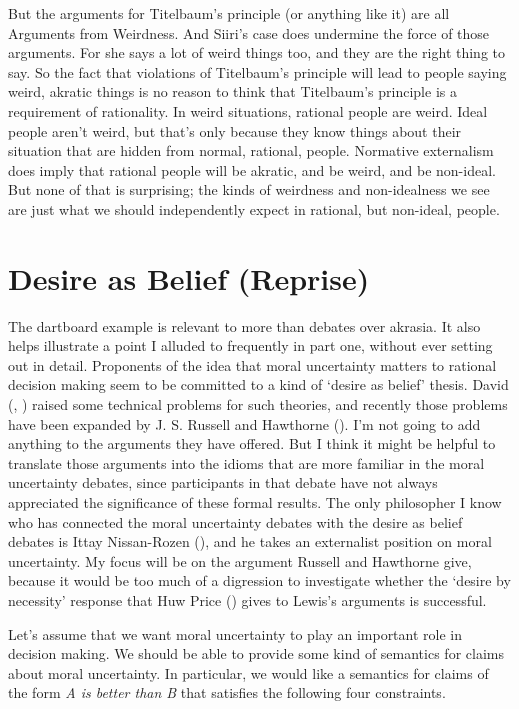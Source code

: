 \documentclass[
  10pt,
  letterpaper,
  twoside]{scrbook}
\begin{document}
But the arguments for Titelbaum's principle (or anything like it) are
all Arguments from Weirdness. And {Siiri}'s case does undermine the
force of those arguments. For she says a lot of weird things too, and
they are the right thing to say. So the fact that violations of
Titelbaum's principle will lead to people saying weird, akratic things
is no reason to think that Titelbaum's principle is a requirement of
rationality. In weird situations, rational people are weird. Ideal
people aren't weird, but that's only because they know things about
their situation that are hidden from normal, rational, people. Normative
externalism does imply that rational people will be akratic, and be
weird, and be non-ideal. But none of that is surprising; the kinds of
weirdness and non-idealness we see are just what we should independently
expect in rational, but non-ideal, people.

\section{Desire as Belief (Reprise)}\label{desireasbeliefreprise}

The dartboard example is relevant to more than debates over akrasia. It
also helps illustrate a point I alluded to frequently in part one,
without ever setting out in detail. Proponents of the idea that moral
uncertainty matters to rational decision making seem to be committed to
a kind of `desire as belief' thesis. David
(,
) raised some technical problems for
such theories, and recently those problems have been expanded by J. S.
Russell and Hawthorne (). I'm
not going to add anything to the arguments they have offered. But I
think it might be helpful to translate those arguments into the idioms
that are more familiar in the moral uncertainty debates, since
participants in that debate have not always appreciated the significance
of these formal results. The only philosopher I know who has connected
the moral uncertainty debates with the desire as belief debates is Ittay
Nissan-Rozen (), and he takes an
externalist position on moral uncertainty. My focus will be on the
argument Russell and Hawthorne give, because it would be too much of a
digression to investigate whether the `desire by necessity' response
that Huw Price () gives to Lewis's
arguments is successful.

Let's assume that we want moral uncertainty to play an important role in
decision making. We should be able to provide some kind of semantics for
claims about moral uncertainty. In particular, we would like a semantics
for claims of the form \emph{A is better than B} that satisfies the
following four constraints.
\end{document}
